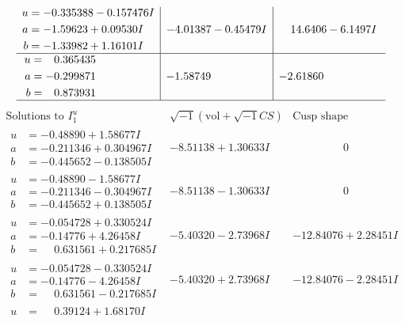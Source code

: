 \documentclass[1p]{elsarticle_modified}
\theoremstyle{definition}
\newcommand{\I}{\sqrt{-1}}
\begin{document}
$$\begin{array}{c|c|c}
\begin{aligned}
u &= -0.335388 - 0.157476 I \\
a &= -1.59623 + 0.09530 I \\
b &= -1.33982 + 1.16101 I\end{aligned}
 & -4.01387 - 0.45479 I & \phantom{-}14.6406 - 6.1497 I \\ \hline\begin{aligned}
u &= \phantom{-}0.365435\phantom{ +0.000000I} \\
a &= -0.299871\phantom{ +0.000000I} \\
b &= \phantom{-}0.873931\phantom{ +0.000000I}\end{aligned}
 & -1.58749\phantom{ +0.000000I} & -2.61860\phantom{ +0.000000I}\\
 \hline 
 \end{array}$$\newpage$$\begin{array}{c|c|c}  
\text{Solutions to }I^u_{1}& \I (\text{vol} + \sqrt{-1}CS) & \text{Cusp shape}\\
 \hline 
\begin{aligned}
u &= -0.48890 + 1.58677 I \\
a &= -0.211346 + 0.304967 I \\
b &= -0.445652 - 0.138505 I\end{aligned}
 & -8.51138 + 1.30633 I & \phantom{-0.000000 } 0 \\ \hline\begin{aligned}
u &= -0.48890 - 1.58677 I \\
a &= -0.211346 - 0.304967 I \\
b &= -0.445652 + 0.138505 I\end{aligned}
 & -8.51138 - 1.30633 I & \phantom{-0.000000 } 0 \\ \hline\begin{aligned}
u &= -0.054728 + 0.330524 I \\
a &= -0.14776 + 4.26458 I \\
b &= \phantom{-}0.631561 + 0.217685 I\end{aligned}
 & -5.40320 - 2.73968 I & -12.84076 + 2.28451 I \\ \hline\begin{aligned}
u &= -0.054728 - 0.330524 I \\
a &= -0.14776 - 4.26458 I \\
b &= \phantom{-}0.631561 - 0.217685 I\end{aligned}
 & -5.40320 + 2.73968 I & -12.84076 - 2.28451 I \\ \hline\begin{aligned}
u &= \phantom{-}0.39124 + 1.68170 I \\

\end{aligned}
\end{array}$$
\end{document}
